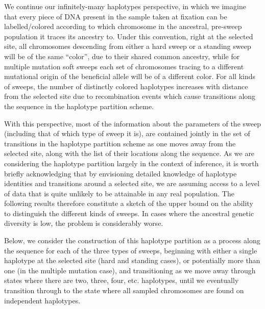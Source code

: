 \documentclass[a4paper,10pt]{article}
\begin{document}

We continue our infinitely-many haplotypes perspective, in which we imagine that every piece of DNA present in the sample taken at fixation can be labelled/colored according to which chromosome in the ancestral, pre-sweep population it traces its ancestry to. Under this convention, right at the selected site, all chromosomes descending from either a hard sweep or a standing sweep will be of the same ``color'', due to their shared common ancestry, while for multiple mutation soft sweeps each set of chromosomes tracing to a different mutational origin of the beneficial allele will be of a different color. For all kinds of sweeps, the number of distinctly colored haplotypes increases with distance from the selected site due to recombination events which cause transitions along the sequence in the haplotype partition scheme.

With this perspective, most of the information about the parameters of the sweep (including that of which type of sweep it is), are contained jointly in the set of transitions in the haplotype partition scheme as one moves away from the selected site, along with the list of their locations along the sequence. As we are considering the haplotype partition largely in the context of inference, it is worth briefly acknowledging that by envisioning detailed knowledge of haplotype identities and transitions around a selected site, we are assuming access to a level of data that is quite unlikely to be attainable in any real population. The following results therefore constitute a sketch of the upper bound on the ability to distinguish the different kinds of sweeps. In cases where the ancestral genetic diversity is low, the problem is considerably worse.

Below, we consider the construction of this haplotype partition as a process along the sequence for each of the three types of sweeps, beginning with either a single haplotype at the selected site (hard and standing cases), or potentially more than one (in the multiple mutation case), and transitioning as we move away through states where there are two, three, four, etc. haplotypes, until we eventually transition through to the state where all sampled chromosomes are found on independent haplotypes. 
\end{document}
